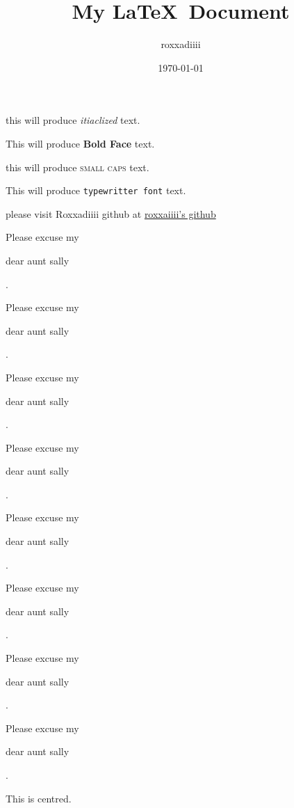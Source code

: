 \documentclass[15pt]{article}
\title{My \LaTeX\  Document}
\author{roxxadiiii}
\date{\today}
\begin{document}
	\tableofcontents
	\maketitle
	this will produce \textit{itiaclized} text.
	
	This will produce \textbf{Bold Face} text.
	
	this will produce \textsc{small caps} text.
	
	This will produce \texttt{typewritter font} text.
	
	\vspace{2cm}
	
	please visit Roxxadiiii github at \href{https://github.com/roxxadiiii/latex}{roxxaiiii's github}
	
	\vspace{2cm}
	
	Please excuse my  \begin{large}
		dear aunt sally
	\end{large}.
	
	Please excuse my \begin{Large}
		dear aunt sally
	\end{Large}.
	
	Please excuse my \begin{huge}
		dear aunt sally
	\end{huge}.
	
	Please excuse my \begin{Huge}
		dear aunt sally
	\end{Huge}.
	
	Please excuse my \begin{normalsize}
		dear aunt sally
	\end{normalsize}.
	
	Please excuse my \begin{small}
		dear aunt sally
	\end{small}.
	
	Please excuse my \begin{scriptsize}
		dear aunt sally
	\end{scriptsize}.
	
	Please excuse my \begin{tiny}
		dear aunt sally
	\end{tiny}.
	
	\vspace{2cm}
	
	\begin{center}
		This is centred.
	\end{center}
	
\end{document}
